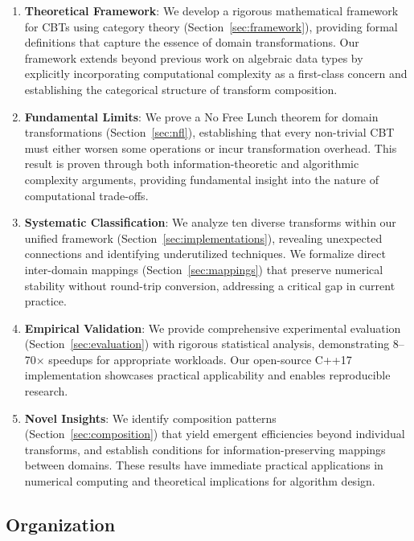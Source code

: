\documentclass[11pt]{article}
\theoremstyle{definition}
\begin{document}
\begin{enumerate}
\item \textbf{Theoretical Framework}: We develop a rigorous mathematical framework for CBTs using category theory (Section~\ref{sec:framework}), providing formal definitions that capture the essence of domain transformations. Our framework extends beyond previous work on algebraic data types \cite{bird1997algebra} by explicitly incorporating computational complexity as a first-class concern and establishing the categorical structure of transform composition.

\item \textbf{Fundamental Limits}: We prove a No Free Lunch theorem for domain transformations (Section~\ref{sec:nfl}), establishing that every non-trivial CBT must either worsen some operations or incur transformation overhead. This result is proven through both information-theoretic and algorithmic complexity arguments, providing fundamental insight into the nature of computational trade-offs.

\item \textbf{Systematic Classification}: We analyze ten diverse transforms within our unified framework (Section~\ref{sec:implementations}), revealing unexpected connections and identifying underutilized techniques. We formalize direct inter-domain mappings (Section~\ref{sec:mappings}) that preserve numerical stability without round-trip conversion, addressing a critical gap in current practice.

\item \textbf{Empirical Validation}: We provide comprehensive experimental evaluation (Section~\ref{sec:evaluation}) with rigorous statistical analysis, demonstrating 8--70× speedups for appropriate workloads. Our open-source C++17 implementation showcases practical applicability and enables reproducible research.

\item \textbf{Novel Insights}: We identify composition patterns (Section~\ref{sec:composition}) that yield emergent efficiencies beyond individual transforms, and establish conditions for information-preserving mappings between domains. These results have immediate practical applications in numerical computing and theoretical implications for algorithm design.
\end{enumerate}

\subsection{Organization}
\end{document}
